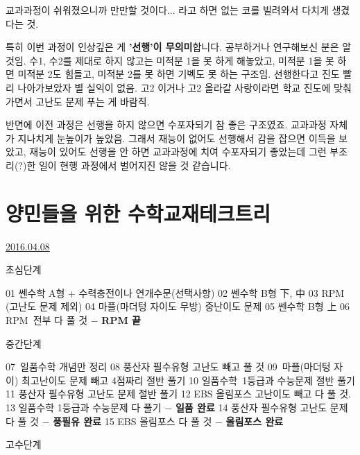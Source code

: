 교과과정이 쉬워졌으니까 만만할 것이다... 라고 하면 없는 코를 빌려와서 다치게 생겼다는 것.
\vspace{5mm}

특히 이번 과정이 인상깊은 게 \textbf{'선행'이 무의미}합니다. 공부하거나 연구해보신 분은 알 것임.
수1, 수2를 제대로 하지 않고는 미적분 1을 못 하게 해놓았고, 미적분 1을 못 하면 미적분 2도 힘들고, 미적분 2를 못 하면 기벡도 못 하는 구조임.
선행한다고 진도 빨리 나아가보았자 별 실익이 없음. 고2 이거나 고2 올라갈 사랑이라면 학교 진도에 맞춰가면서 고난도 문제 푸는 게 바람직.
\vspace{5mm}

반면에 이전 과정은 선행을 하지 않으면 수포자되기 참 좋은 구조였죠. 교과과정 자체가 지나치게 눈높이가 높았음.
그래서 재능이 없어도 선행해서 감을 잡으면 이득을 보았고, 재능이 있어도 선행을 안 하면 교과과정에 치여 수포자되기 좋았는데
그런 부조리(?)한 일이 현행 과정에서 벌어지진 않을 것 같습니다.
\vspace{5mm}








\section{양민들을 위한 수학교재테크트리}
\href{https://www.kockoc.com/Apoc/717659}{2016.04.08}

\vspace{5mm}

초심단계
\vspace{5mm}

01 쎈수학 A형 + 수력충전이나 연개수문(선택사항)
02 쎈수학 B형 下, 中
03 RPM (고난도 문제 제외)
04 마플(마더텅 자이도 무방) 중난이도 문제
05 쎈수학 B형 上
06 RPM 전부 다 풀 것 $-$ \textbf{RPM 끝}
\vspace{5mm}

중간단계
\vspace{5mm}

07 일품수학 개념만 정리
08 풍산자 필수유형 고난도 빼고 풀 것
09 마플(마더텅 자이) 최고난이도 문제 빼고 4점짜리 절반 풀기
10 일품수학 1등급과 수능문제 절반 풀기
11 풍산자 필수유형 고난도 문제 절반 풀기
12 EBS 올림포스 고난이도 빼고 다 풀 것.
13 일품수학 1등급과 수능문제 다 풀기 $-$ \textbf{일품 완료}
14 풍산자 필수유형 고난도 문제 다 풀 것 $-$ \textbf{풍필유 완료}
15 EBS 올림포스 다 풀 것 $-$ \textbf{올림포스 완료}
\vspace{5mm}

고수단계
\vspace{5mm}

